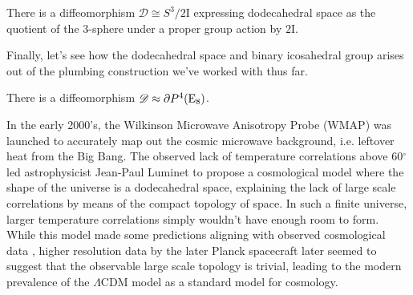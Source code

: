\begin{proposition}
	There is a diffeomorphism $\mathscr{D} \cong S^3 / 2\mathrm{I}$ expressing dodecahedral space as the quotient of the $3$-sphere under a proper group action by $2\mathrm{I}$.
\end{proposition}

Finally, let's see how the dodecahedral space and binary icosahedral group arises out of the plumbing construction we've worked with thus far.


\begin{proposition}
	There is a diffeomorphism $\mathscr{D}\approx \partial P^4({\operatorname{E}}_8)$.
\end{proposition}


\begin{remark}
  In the early 2000's, the Wilkinson Microwave Anisotropy Probe (WMAP) was launched to accurately map out the cosmic microwave background, i.e. leftover heat from the Big Bang. The observed lack of temperature correlations above 60$^\circ$ led astrophysicist Jean-Paul Luminet to propose a cosmological model \cite{luminet2003dodecahedral} where the shape of the universe is a dodecahedral space, explaining the lack of large scale correlations by means of the compact topology of space. In such a finite universe, larger temperature correlations simply wouldn't have enough room to form.
  While this model made some predictions aligning with observed cosmological data
  \cite{roukema2008dodecahedral}, higher resolution data by the later Planck spacecraft later seemed to suggest that the observable large scale topology is trivial, leading to the modern prevalence of the $\Lambda$CDM model as a standard model for cosmology.
\end{remark}
